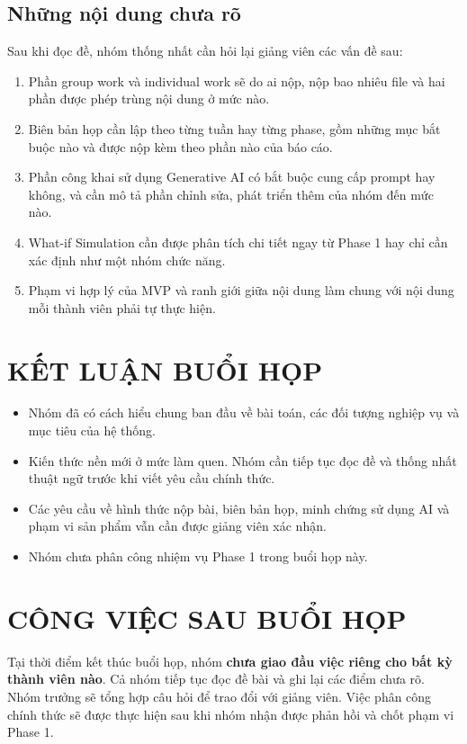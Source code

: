 \documentclass[10pt,a4paper]{article}
\begin{document}
\subsection{Những nội dung chưa rõ}

Sau khi đọc đề, nhóm thống nhất cần hỏi lại giảng viên các vấn đề sau:

\begin{enumerate}
  \item Phần group work và individual work sẽ do ai nộp, nộp bao nhiêu file và hai phần được phép trùng nội dung ở mức nào.
  \item Biên bản họp cần lập theo từng tuần hay từng phase, gồm những mục bắt buộc nào và được nộp kèm theo phần nào của báo cáo.
  \item Phần công khai sử dụng Generative AI có bắt buộc cung cấp prompt hay không, và cần mô tả phần chỉnh sửa, phát triển thêm của nhóm đến mức nào.
  \item What-if Simulation cần được phân tích chi tiết ngay từ Phase 1 hay chỉ cần xác định như một nhóm chức năng.
  \item Phạm vi hợp lý của MVP và ranh giới giữa nội dung làm chung với nội dung mỗi thành viên phải tự thực hiện.
\end{enumerate}

\section{KẾT LUẬN BUỔI HỌP}

\begin{itemize}
  \item Nhóm đã có cách hiểu chung ban đầu về bài toán, các đối tượng nghiệp vụ và mục tiêu của hệ thống.
  \item Kiến thức nền mới ở mức làm quen. Nhóm cần tiếp tục đọc đề và thống nhất thuật ngữ trước khi viết yêu cầu chính thức.
  \item Các yêu cầu về hình thức nộp bài, biên bản họp, minh chứng sử dụng AI và phạm vi sản phẩm vẫn cần được giảng viên xác nhận.
  \item Nhóm chưa phân công nhiệm vụ Phase 1 trong buổi họp này.
\end{itemize}

\section{CÔNG VIỆC SAU BUỔI HỌP}

Tại thời điểm kết thúc buổi họp, nhóm \textbf{chưa giao đầu việc riêng cho bất kỳ thành viên nào}. Cả nhóm tiếp tục đọc đề bài và ghi lại các điểm chưa rõ. Nhóm trưởng sẽ tổng hợp câu hỏi để trao đổi với giảng viên. Việc phân công chính thức sẽ được thực hiện sau khi nhóm nhận được phản hồi và chốt phạm vi Phase 1.
\end{document}

